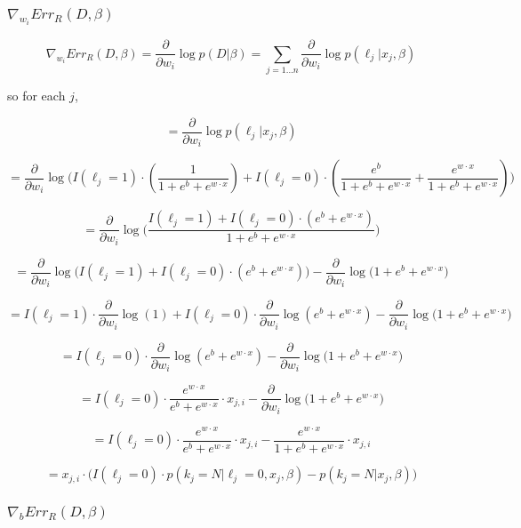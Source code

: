 \documentclass[]{article}
\begin{document}
\subsubsection{$ \nabla_{w_i}{Err_R (D, \beta)}$}

$$
\nabla_{w_i}{Err_R (D, \beta)} = \frac{\partial}{\partial w_i} \log{p(D|\beta)} =  \sum_{j=1...n}{\frac{\partial}{\partial w_i}\log{p(\ell_j | x_j, \beta)}}
$$

so for each $j$,

$$
 = \frac{\partial}{\partial w_i}\log{p(\ell_j | x_j, \beta)}
$$

$$
 = \frac{\partial}{\partial w_i}
		\log{\Bigg(
			I(\ell_j=1) \cdot \left( \frac{1}{1 + e^b + e^{w \cdot x}} \right) + 
			I(\ell_j=0) \cdot \left(\frac{e^b}{1 + e^b + e^{w \cdot x}} + \frac{e^{w \cdot x}}{1 + e^b + e^{w \cdot x}} \right)
		\Bigg)}
$$

$$
 = \frac{\partial}{\partial w_i}
		\log{\Bigg(
		    \frac{
			I(\ell_j=1) + 
			I(\ell_j=0) \cdot \left( e^b + e^{w \cdot x} \right)
		     }{1 + e^b + e^{w \cdot x}}
		\Bigg)}
$$

$$
 = \frac{\partial}{\partial w_i}
		\log{\bigg(
			I(\ell_j=1) + 
			I(\ell_j=0) \cdot \left( e^b + e^{w \cdot x} \right)
		\bigg)}
		- \frac{\partial}{\partial w_i}
		 \log{\bigg(
			1 + e^b + e^{w \cdot x}
		\bigg)}
$$


$$
 = I(\ell_j=1) \cdot \frac{\partial}{\partial w_i}
		\log{(1)} +
    I(\ell_j=0) \cdot \frac{\partial}{\partial w_i}
		\log{ \left( e^b + e^{w \cdot x} \right) }
		- \frac{\partial}{\partial w_i}
		 \log{\bigg(
			1 + e^b + e^{w \cdot x}
		\bigg)}
$$

$$
 = I(\ell_j=0) \cdot \frac{\partial}{\partial w_i}
		\log{  \left( e^b + e^{w \cdot x} \right) }
		- \frac{\partial}{\partial w_i}
		 \log{\bigg(
			1 + e^b + e^{w \cdot x}
		\bigg)}
$$


$$
 = I(\ell_j=0) \cdot 
 		\frac{
			e^{w \cdot x}
		}{
			e^b + e^{w \cdot x}
		} \cdot x_{j,i}
		- \frac{\partial}{\partial w_i}
		 \log{\Big(
			1 + e^b + e^{w \cdot x}
		\Big)}
$$

$$
 = I(\ell_j=0) \cdot 
 		\frac{
			e^{w \cdot x}
		}{
			e^b + e^{w \cdot x}
		} \cdot x_{j,i}
		- \frac{e^{w \cdot x}}{
			1 + e^b + e^{w \cdot x}
		} \cdot x_{j,i}
$$

$$
 = x_{j,i} \cdot
    \Big(	I(\ell_j=0) \cdot p(k_j=N | \ell_j=0, x_j, \beta) - 
		p(k_j=N | x_j, \beta)
    \Big)
$$

\subsubsection{$ \nabla_{b}{Err_R (D, \beta)}$}
\end{document}
